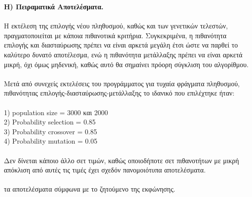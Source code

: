 \documentclass[12pt]{article}
\begin{document}
{\bfseries H) Πειραματικά Αποτελέσματα.}\\\\
Η εκτέλεση της επιλογής νέου πληθυσμού, καθώς και των γενετικών τελεστών, πραγματοποιείται με κάποια πιθανοτικά κριτήρια. Συγκεκριμένα, η πιθανότητα επιλογής και διασταύρωσης πρέπει να είναι αρκετά μεγάλη έτσι ώστε να παρθεί το καλύτερο δυνατό αποτέλεσμα, ενώ η πιθανότητα μετάλλαξης πρέπει να είναι αρκετά μικρή, όχι όμως μηδενική, καθώς αυτό θα σημαίνει πρόορη σύγκλιση του αλγορίθμου.\\\\
Μετά από συνεχείς εκτελέσεις του προγράμματος για τυχαία φράγματα πληθυσμού, πιθανότητας επιλογής-διασταύρωσης-μετάλλαξης το ιδανικό που επιλέχτηκε ήταν:\\\\
1) population size = 3000 και 2000\\
2) Probability selection = 0.85\\
3) Probability crossover = 0.85\\
4) Probability mutation = 0.05\\\\
Δεν δίνεται κάποιο άλλο σετ τιμών, καθώς οποιοδήποτε σετ πιθανοτήτων με μικρή απόκλιση από αυτές τις τιμές έχει σχεδόν πανομοιότυπα αποτελέσματα.\\\\

{ τα αποτελέσματα σύμφωνα με το ζητούμενο της εκφώνησης.}\\\\
\end{document}
